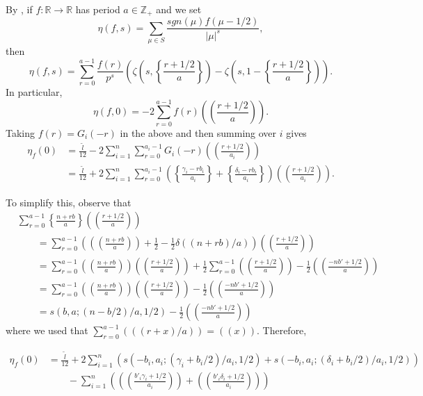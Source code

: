 \documentclass{amsart}
\theoremstyle{definition}
\theoremstyle{remark}
\numberwithin{equation}{section}
\begin{document}
By \cite[Lemma 1.11]{nic2}, if $f : \mathbb{R} \to \mathbb{R}$ has period $a \in \mathbb{Z}_+$ and we set
\[
\eta(f,s) = \sum_{\mu \in S} \frac{ sgn(\mu) f(\mu - 1/2) }{|\mu|^s},
\]
then
\[
\eta(f,s) = \sum_{r=0}^{a-1} \frac{f(r)}{p^s} \left( \zeta( s , \left\{ \frac{r+1/2}{a} \right\} ) - \zeta( s , 1 - \left\{ \frac{r+1/2}{a} \right\} ) \right).
\]
In particular,
\[
\eta(f,0) = -2\sum_{r=0}^{a-1} f(r) \left( \! \left( \frac{ r + 1/2 }{a} \right) \! \right).
\]
Taking $f(r) = G_i(-r)$ in the above and then summing over $i$ gives
\begin{align*}
\eta_f(0) &= \frac{\widetilde{l}}{12} -2 \sum_{i=1}^n \sum_{r=0}^{a_i - 1} G_i(-r) \left( \! \left( \frac{ r + 1/2 }{a_i} \right) \! \right) \\
&= \frac{\widetilde{l}}{12} + 2 \sum_{i=1}^n \sum_{r=0}^{a_i-1} \left( \left\{ \frac{ \gamma_i - rb_i}{a_i} \right\} + \left\{ \frac{\delta_i - rb_i}{a_i} \right\} \right)\left( \! \left( \frac{ r + 1/2 }{a_i } \right) \! \right).
\end{align*}

To simplify this, observe that
\begin{align*}
& \sum_{r=0}^{a-1} \left\{ \frac{n+rb}{a} \right\} \left( \! \left( \frac{ r + 1/2 }{a} \right) \! \right) \\
& \quad \quad = \sum_{r=0}^{a-1} \left( \left( \! \left( \frac{n+rb}{a} \right) \! \right) + \frac{1}{2} - \frac{1}{2} \delta( (n+rb)/a ) \right) \left( \! \left( \frac{ r + 1/2 }{a } \right) \! \right) \\
&\quad \quad  = \sum_{r=0}^{a-1} \left( \! \left( \frac{n+rb}{a} \right) \! \right) \left( \! \left( \frac{ r + 1/2}{a} \right) \! \right) + \frac{1}{2} \sum_{r=0}^{a-1} \left( \! \left( \frac{ r + 1/2 }{a } \right) \! \right) - \frac{1}{2} \left( \! \left( \frac{ -nb' + 1/2 }{a } \right) \! \right) \\
& \quad \quad = \sum_{r=0}^{a-1} \left( \! \left( \frac{n+rb}{a} \right) \! \right) \left( \! \left( \frac{ r + 1/2}{a} \right) \! \right)  - \frac{1}{2} \left( \! \left( \frac{ -nb' + 1/2 }{a } \right) \! \right) \\
& \quad \quad = s(b,a ; (n-b/2)/a , 1/2) - \frac{1}{2} \left( \! \left( \frac{ -nb' + 1/2 }{a } \right) \! \right)
\end{align*}
where we used that $\sum_{r=0}^{a-1} (\! ( (r+x)/a )\! ) = ((x))$. Therefore,

\begin{align*}
\eta_f(0) & = \frac{\widetilde{l}}{12} + 2 \sum_{i=1}^n \left( s(-b_i,a_i; (\gamma_i + b_i/2)/a_i , 1/2) + s(-b_i , a_i ; (\delta_i + b_i/2)/a_i , 1/2) \right) \\
& \quad \quad - \sum_{i=1}^n \left( \left( \! \left( \frac{ b'_i \gamma_i + 1/2}{a_i} \right)\! \right) + \left( \! \left( \frac{b'_i \delta_i + 1/2}{a_i} \right) \! \right) \right)
\end{align*}
\end{document}
